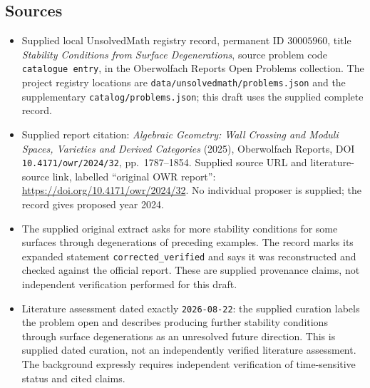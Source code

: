 \documentclass[11pt]{article}
\begin{document}
\subsection{Sources}
\begin{itemize}
\item Supplied local UnsolvedMath registry record, permanent ID \(30005960\), title \emph{Stability Conditions from Surface Degenerations}, source problem code \texttt{catalogue entry}, in the Oberwolfach Reports Open Problems collection. The project registry locations are \texttt{data/unsolvedmath/problems.json} and the supplementary \texttt{catalog/problems.json}; this draft uses the supplied complete record.
\item Supplied report citation: \emph{Algebraic Geometry: Wall Crossing and Moduli Spaces, Varieties and Derived Categories} (2025), Oberwolfach Reports, DOI \texttt{10.4171/owr/2024/32}, pp.\ 1787--1854. Supplied source URL and literature-source link, labelled ``original OWR report'': \url{https://doi.org/10.4171/owr/2024/32}. No individual proposer is supplied; the record gives proposed year 2024.
\item The supplied original extract asks for more stability conditions for some surfaces through degenerations of preceding examples. The record marks its expanded statement \texttt{corrected\_verified} and says it was reconstructed and checked against the official report. These are supplied provenance claims, not independent verification performed for this draft.
\item Literature assessment dated exactly \texttt{2026-08-22}: the supplied curation labels the problem open and describes producing further stability conditions through surface degenerations as an unresolved future direction. This is supplied dated curation, not an independently verified literature assessment. The background expressly requires independent verification of time-sensitive status and cited claims.
\end{itemize}
\end{document}
